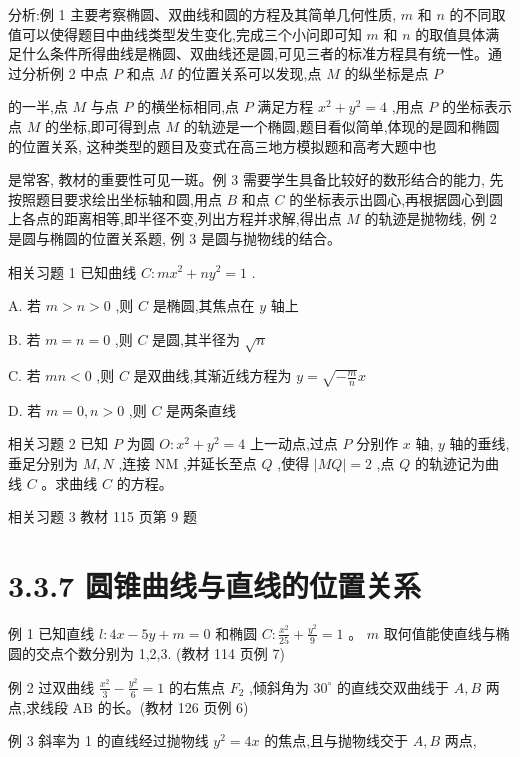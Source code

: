 \documentclass[10pt]{article}
\begin{document}
分析:例 1 主要考察椭圆、双曲线和圆的方程及其简单几何性质, \(m\) 和 \(n\) 的不同取值可以使得题目中曲线类型发生变化,完成三个小问即可知 \(m\) 和 \(n\) 的取值具体满足什么条件所得曲线是椭圆、双曲线还是圆,可见三者的标准方程具有统一性。通过分析例 2 中点 \(P\) 和点 \(M\) 的位置关系可以发现,点 \(M\) 的纵坐标是点 \(P\)

的一半,点 \(M\) 与点 \(P\) 的横坐标相同,点 \(P\) 满足方程 \({x}^{2} + {y}^{2} = 4\) ,用点 \(P\) 的坐标表示点 \(M\) 的坐标,即可得到点 \(M\) 的轨迹是一个椭圆,题目看似简单,体现的是圆和椭圆的位置关系, 这种类型的题目及变式在高三地方模拟题和高考大题中也

是常客, 教材的重要性可见一斑。例 3 需要学生具备比较好的数形结合的能力, 先按照题目要求绘出坐标轴和圆,用点 \(B\) 和点 \(C\) 的坐标表示出圆心,再根据圆心到圆上各点的距离相等,即半径不变,列出方程并求解,得出点 \(M\) 的轨迹是抛物线, 例 2 是圆与椭圆的位置关系题, 例 3 是圆与抛物线的结合。

相关习题 1 已知曲线 \(C : m{x}^{2} + n{y}^{2} = 1\) .

A. 若 \(m > n > 0\) ,则 \(C\) 是椭圆,其焦点在 \(y\) 轴上

B. 若 \(m = n = 0\) ,则 \(C\) 是圆,其半径为 \(\sqrt{n}\)

C. 若 \({mn} < 0\) ,则 \(C\) 是双曲线,其渐近线方程为 \(y = \sqrt{-\frac{m}{n}}x\)

D. 若 \(m = 0,n > 0\) ,则 \(C\) 是两条直线

相关习题 2 已知 \(P\) 为圆 \(O : {x}^{2} + {y}^{2} = 4\) 上一动点,过点 \(P\) 分别作 \(x\) 轴, \(y\) 轴的垂线,垂足分别为 \(M,N\) ,连接 \(\mathrm{{NM}}\) ,并延长至点 \(Q\) ,使得 \(\left| {MQ}\right|  = 2\) ,点 \(Q\) 的轨迹记为曲线 \(C\) 。求曲线 \(C\) 的方程。

相关习题 3 教材 115 页第 9 题

\section*{3.3.7 圆锥曲线与直线的位置关系}

例 1 已知直线 \(l : {4x} - {5y} + m = 0\) 和椭圆 \(C : \frac{{x}^{2}}{25} + \frac{{y}^{2}}{9} = 1\) 。 \(m\) 取何值能使直线与椭圆的交点个数分别为 1,2,3. (教材 114 页例 7)

例 2 过双曲线 \(\frac{{x}^{2}}{3} - \frac{{y}^{2}}{6} = 1\) 的右焦点 \({F}_{2}\) ,倾斜角为 \({30}^{ \circ  }\) 的直线交双曲线于 \(A,B\) 两点,求线段 \(\mathrm{{AB}}\) 的长。(教材 126 页例 6)

例 3 斜率为 1 的直线经过抛物线 \({y}^{2} = {4x}\) 的焦点,且与抛物线交于 \(A,B\) 两点,
\end{document}
